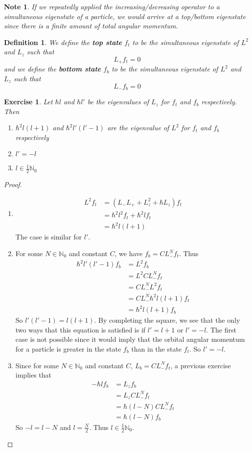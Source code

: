 \documentclass[12pt]{amsart}
\newtheorem{defn}[thm]{Definition}
\newtheorem{note}[thm]{Note}
\newtheorem{ex}[thm]{Exercise}
\newcommand{\N}{\mathbb{N}}
\begin{document}
\begin{note}
If we repeatedly applied the increasing/decreasing operator to a simultaneous eigenstate of a particle, we would arrive at a top/bottom eigenstate since there is a finite amount of total angular momentum.
\end{note}

\begin{defn}
We define the \textbf{top state} $f_t$ to be the simultaneous eigenstate of $L^2$ and $L_z$ such that $$L_+f_t = 0$$ and we define the \textbf{bottom state} $f_b$ to be the simultaneous eigenstate of $L^2$ and $L_z$ such that $$L_-f_b = 0$$ 
\end{defn}

\begin{ex}
Let $\hbar l$ and $\hbar l'$ be the eigenvalues of $L_z$ for $f_t$ and $f_b$ respectively. Then 
\begin{enumerate}
\item $\hbar^2l(l+1)$ and $\hbar^2l'(l'-1)$ are the eigenvalue of $L^2$ for $f_t$ and $f_b$ respectively
\item $l'=-l$
\item $l \in \frac{1}{2}\N_0$
\end{enumerate}
\end{ex}

\begin{proof}\
\begin{enumerate}
\item 
\begin{align*}
L^2 f_t 
&= (L_-L_+ +L_z^2 +\hbar L_z)f_t\\
&= \hbar^2l^2 f_t + \hbar^2l f_t\\
&= \hbar^2l(l+1)
\end{align*}
The case is similar for $l'$.
\item For some $N \in \N_0$ and constant $C$, we have $f_b = C L_-^Nf_t$. Thus 
\begin{align*}
\hbar^2l'(l'-1)f_b
&= L^2 f_b \\
&= L^2 C L_-^Nf_t\\
&= CL_-^NL^2 f_t\\
&= CL_-^N \hbar^2 l (l+1) f_t\\
&= \hbar^2l(l+1)f_b
\end{align*} 
So $l'(l'-1) = l(l+1)$. By completing the square, we see that the only two ways that this equation is satisfied is if $l' = l+1$ or $l' = -l$. The first case is not possible since it would imply that the orbital angular momentum for a particle is greater in the state $f_b$ than in the state $f_t$. So $l' = -l$.  
\item Since for some $N \in \N_0$ and constant $C$, $L_b = CL_-^Nf_t$, a previous exercise implies that 
\begin{align*}
-\hbar lf_b
&= L_z f_b\\
&= L_z C L_-^N f_t\\
&= \hbar (l-N) CL_-^N f_t\\
&= \hbar (l-N) f_b
\end{align*}
So $-l = l-N$ and $l = \frac{N}{2}$. Thus $l \in \frac{1}{2}\N_0$.
\end{enumerate}
\end{proof}
\end{document}
